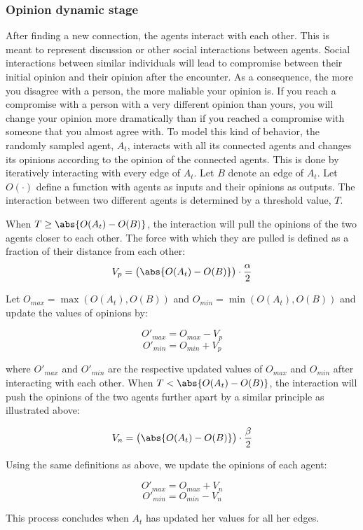 \documentclass{article}
\DeclarePairedDelimiter{\abs}\lvert\rvert
\begin{document}
\subsubsection{Opinion dynamic stage}
After finding a new connection, the agents interact with each other. This is meant to represent 
discussion or other social interactions between agents. 
Social interactions between similar individuals will lead to compromise between their initial opinion and their opinion after the encounter.
As a consequence, the more you disagree with a person, the more maliable your opinion is. If you reach a compromise with a person with a very different opinion than yours,
you will change your opinion more dramatically than if you reached a compromise with someone that you almost agree with. 
To model this kind of behavior, the randomly sampled agent, $A_t$, interacts with all its connected agents and changes its opinions according to the opinion of the connected agents.
This is done by iteratively interacting with every edge of $A_t$. Let $B$ denote an edge of $A_t$. Let $O(\cdot)$ define a function with agents as inputs and their opinions as outputs.
The interaction between two different agents is determined by a threshold value, $T$. 

When $T \geq \abs{O(A_t) - O(B)}$, the interaction will pull the opinions of the two agents closer to each other. The force with which they are pulled is defined as a fraction of their distance from each other:
$$V_p = \big(\abs{O(A_t) - O(B)}\big) \cdot \frac{\alpha}{2}$$

Let $O_{max} = \max(O(A_t), O(B))$ and $O_{min} = \min(O(A_t), O(B))$ and update the values of opinions by:

$$O'_{max} = O_{max} - V_p$$
$$O'_{min} = O_{min} + V_p$$

where $O'_{max}$ and $O'_{min}$ are the respective updated values of $O_{max}$ and $O_{min}$ after interacting with each other. When $T < \abs{O(A_t) - O(B)}$, the interaction will push the opinions of the two agents further apart by a similar principle as illustrated above: 

$$V_n = \big(\abs{O(A_t) - O(B)}\big) \cdot \frac{\beta}{2}$$

Using the same definitions as above, we update the opinions of each agent:

$$O'_{max} = O_{max} + V_n$$
$$O'_{min} = O_{min} - V_n$$

This process concludes when $A_t$ has updated her values for all her edges.
\end{document}
